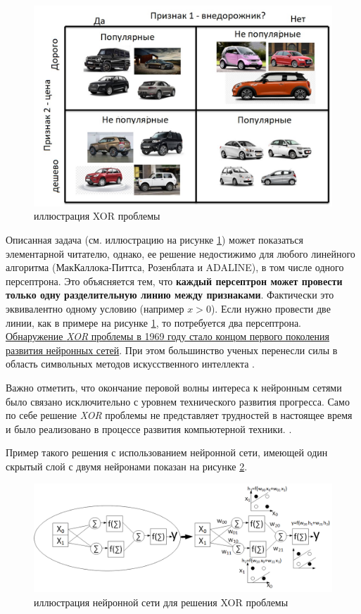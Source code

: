 \documentclass[12pt]{article}
\begin{document}
\begin{sloppypar}
\begin{figure} 
	\begin{center}
		\includegraphics[width=0.7\linewidth]{./figuresch1/XOR_CAR.jpg}
		\caption{иллюстрация XOR проблемы}		
		\label{ch1:fig:XOR}
	\end{center}
\end{figure}

Описанная задача (см. иллюстрацию на рисунке \ref{ch1:fig:XOR}) может показаться элементарной читателю, однако, ее решение недостижимо для любого линейного алгоритма (МакКаллока-Питтса, Розенблата и ADALINE), в том числе одного персептрона. Это объясняется тем, что \textbf{каждый персептрон может провести только одну разделительную линию между признаками}. Фактически это эквивалентно одному условию (например $x>0$). Если нужно провести две линии, как в примере на рисунке \ref{ch1:fig:XOR}, то потребуется два персептрона. 
\uline{
	Обнаружение \emph{XOR} проблемы в 1969 году стало концом первого поколения развития нейронных сетей}.  При этом  большинство ученых перенесли силы в область символьных методов искусственного интеллекта
\cite{goodfellow2016deep}.   

Важно отметить, что окончание перовой волны интереса к нейронным сетями было связано исключительно с уровнем технического развития прогресса. Само по себе решение \emph{XOR} проблемы не представляет трудностей в настоящее время и было реализовано в процессе развития компьютерной техники.
\cite{minsky1969introduction}.

 Пример такого решения с использованием нейронной сети, имеющей один скрытый слой с двумя нейронами показан на рисунке \ref{ch1:fig:XOR_Network}. 

\begin{figure}
	\begin{center}
		\includegraphics[width=0.9\linewidth]{./figuresch1/XOR_Network.png}
		\caption{иллюстрация нейронной сети для решения XOR проблемы}		
		\label{ch1:fig:XOR_Network}
	\end{center}
\end{figure}


\end{sloppypar}
\end{document}
